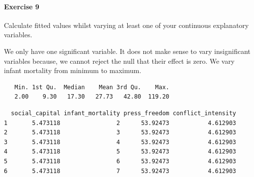 \documentclass[]{article}
\newenvironment{Shaded}{\begin{snugshade}}{\end{snugshade}}
\newcommand{\KeywordTok}[1]{\textcolor[rgb]{0.13,0.29,0.53}{\textbf{#1}}}
\newcommand{\DataTypeTok}[1]{\textcolor[rgb]{0.13,0.29,0.53}{#1}}
\newcommand{\DecValTok}[1]{\textcolor[rgb]{0.00,0.00,0.81}{#1}}
\newcommand{\StringTok}[1]{\textcolor[rgb]{0.31,0.60,0.02}{#1}}
\newcommand{\CommentTok}[1]{\textcolor[rgb]{0.56,0.35,0.01}{\textit{#1}}}
\newcommand{\OperatorTok}[1]{\textcolor[rgb]{0.81,0.36,0.00}{\textbf{#1}}}
\newcommand{\NormalTok}[1]{#1}
\let\oldparagraph\paragraph
\renewcommand{\paragraph}[1]{\oldparagraph{#1}\mbox{}}
\theoremstyle{definition}
\theoremstyle{definition}
\theoremstyle{definition}
\theoremstyle{remark}
\begin{document}
\paragraph{Exercise 9}\label{exercise-9-5}

Calculate fitted values whilst varying at least one of your continuous
explanatory variables.

We only have one significant variable. It does not make sense to vary
insignificant variables because, we cannot reject the null that their
effect is zero. We vary infant mortality from minimum to maximum.

\begin{Shaded}
\end{Shaded}

\begin{verbatim}
   Min. 1st Qu.  Median    Mean 3rd Qu.    Max. 
   2.00    9.30   17.30   27.73   42.80  119.20 
\end{verbatim}

\begin{Shaded}
\end{Shaded}

\begin{verbatim}
  social_capital infant_mortality press_freedom conflict_intensity
1       5.473118                2      53.92473           4.612903
2       5.473118                3      53.92473           4.612903
3       5.473118                4      53.92473           4.612903
4       5.473118                5      53.92473           4.612903
5       5.473118                6      53.92473           4.612903
6       5.473118                7      53.92473           4.612903
\end{verbatim}
\end{document}
